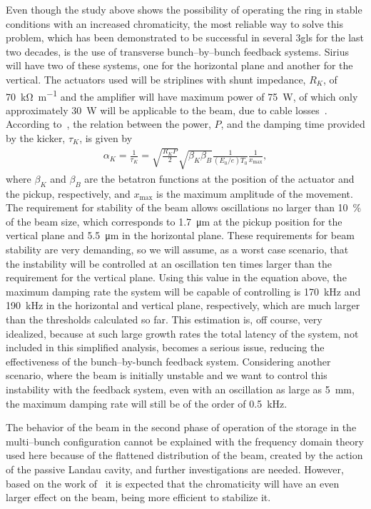     Even though the study above shows the possibility of operating the ring in stable conditions with an increased chromaticity, the most reliable way to solve this problem, which has been demonstrated to be successful in several \gls{3gls} for the last two decades, is the use of transverse bunch--by--bunch feedback systems. Sirius will have two of these systems, one for the horizontal plane and another for the vertical. The actuators used will be striplines with shunt impedance, $R_K$, of \SI{70}{\kilo\ohm\per\meter} and the amplifier will have maximum power of \SI{75}{\watt}, of which only approximately \SI{30}{\watt} will be applicable to the beam, due to cable losses~\cite{Duarte2018}. According to~, the relation between the power, $P$, and the damping time provided by the kicker, $\tau_K$, is given by
    \begin{align}
        \alpha_K = \frac{1}{\tau_K} =
        \sqrt{\frac{R_KP}{2}}\sqrt{\beta_K\beta_B}\frac{1}{(E_0/e)T_0}\frac{1}{x_\text{max}},
    \end{align}
    where $\beta_K$ and $\beta_B$ are the betatron functions at the position of the actuator and the pickup, respectively, and $x_\text{max}$ is the maximum amplitude of the movement. The requirement for stability of the beam allows oscillations no larger than \SI{10}{\percent} of the beam size, which corresponds to \SI{1.7}{\micro\meter} at the pickup position for the vertical plane and \SI{5.5}{\micro\meter} in the horizontal plane. These requirements for beam stability are very demanding, so we will assume, as a worst case scenario, that the instability will be controlled at an oscillation ten times larger than the requirement for the vertical plane. Using this value in the equation above, the maximum damping rate the system will be capable of controlling is \SI{170}{\kilo\hertz} and \SI{190}{\kilo\hertz} in the horizontal and vertical plane, respectively, which are much larger than the thresholds calculated so far. This estimation is, off course, very idealized, because at such large growth rates the total latency of the system, not included in this simplified analysis, becomes a serious issue, reducing the effectiveness of the bunch--by-bunch feedback system.
    Considering another scenario, where the beam is initially unstable and we want to control this instability with the feedback system, even with an oscillation as large as \SI{5}{\milli\meter}, the maximum damping rate will still be of the order of \SI{0.5}{\kilo\hertz}.

    The behavior of the beam in the second phase of operation of the storage in the multi--bunch configuration cannot be explained with the frequency domain theory used here because of the flattened distribution of the beam, created by the action of the passive Landau cavity, and further investigations are needed. However, based on the work of~ it is expected that the chromaticity will have an even larger effect on the beam, being more efficient to stabilize it.

